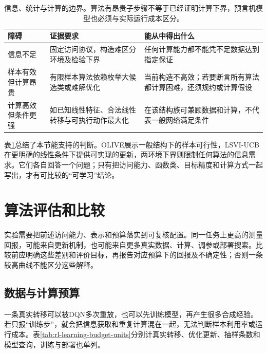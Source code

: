 \begin{table}[t]
  \centering
  \small
  \begin{tabularx}{\linewidth}{>{\raggedright\arraybackslash}p{26mm} >{\raggedright\arraybackslash}X >{\raggedright\arraybackslash}X}
    \toprule
    障碍 & 证据要求 & 能从中得出什么 \\
    \midrule
    信息不足 & 固定访问协议，构造难区分环境及检验下界 & 任何计算能力都不能凭不足数据达到指定保证 \\
    样本有效但计算昂贵 & 有限样本算法依赖枚举大候选类或难解优化 & 当前构造不高效；若要断言所有算法都计算困难，还须规约或计算假设 \\
    计算高效但条件更强 & 如已知线性特征、合法线性转移与可执行动作最大化 & 在该结构族可兼顾数据和计算，不代表一般网络满足条件 \\
    \bottomrule
  \end{tabularx}
  \caption{信息、统计与计算的边界。算法有昂贵子步骤不等于已经证明计算下界，预言机模型也必须与实际运行成本区分。}
  \label{tab:rl-learning-statistical-computational}
\end{table}

表\ref{tab:rl-learning-statistical-computational}总结了本节能支持的判断。OLIVE展示一般结构下的样本可行性，LSVI-UCB在更明确的线性条件下提供可实现的更新，两环境下界则限制任何算法的信息需求。它们各自回答一个问题；只有把访问能力、函数类、目标精度和计算方式一起写出，才有可比较的“可学习”结论。

\section{算法评估和比较}
\label{sec:rl-learning-evaluation}

实验需要把前述访问能力、表示和预算落实到可复核配置。同一任务上更高的测量回报，可能来自更新机制，也可能来自更多真实数据、计算、调参或部署搜索。比较前应明确这些差别和评价目标，再报告对应预算下的回报及不确定性；否则一条较高曲线不能区分这些解释。

\subsection{数据与计算预算}
\label{sec:rl-learning-budget}

一条真实转移可以被DQN多次重放，也可以先训练模型，再产生很多合成经验。若只报“训练步”，就会把信息获取和重复计算混在一起，无法判断样本利用率或运行成本。表\ref{tab:rl-learning-budget-units}分别计真实转移、优化更新、抽样条数和模型查询，训练与部署也单列。

